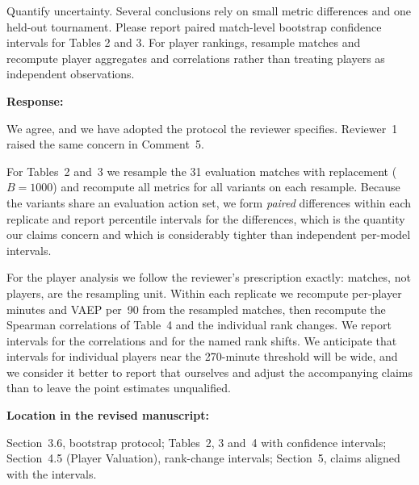 \documentclass[11pt,a4paper]{article}
\newcommand{\pending}[1]{\textcolor{statuspending}{#1}}
\newcommand{\response}[2]{%
  \begin{responsebox}
  \textbf{Response:}

  #1
  \end{responsebox}
  \begin{locationbox}
  \textbf{Location in the revised manuscript:}

  #2
  \end{locationbox}
}
\begin{document}
\begin{reviewbox}[Comment 2]
Quantify uncertainty. Several conclusions rely on small metric differences and one held-out tournament. Please report paired match-level bootstrap confidence intervals for Tables 2 and 3. For player rankings, resample matches and recompute player aggregates and correlations rather than treating players as independent observations.
\end{reviewbox}
\response{We agree, and we have adopted the protocol the reviewer specifies. Reviewer~1 raised the same concern in Comment~5.

\pending{For Tables~2 and~3 we resample the 31 evaluation matches with replacement ($B = 1000$) and recompute all metrics for all variants on each resample. Because the variants share an evaluation action set, we form \emph{paired} differences within each replicate and report percentile intervals for the differences, which is the quantity our claims concern and which is considerably tighter than independent per-model intervals.}

\pending{For the player analysis we follow the reviewer's prescription exactly: matches, not players, are the resampling unit. Within each replicate we recompute per-player minutes and VAEP per~90 from the resampled matches, then recompute the Spearman correlations of Table~4 and the individual rank changes. We report intervals for the correlations and for the named rank shifts. We anticipate that intervals for individual players near the 270-minute threshold will be wide, and we consider it better to report that ourselves and adjust the accompanying claims than to leave the point estimates unqualified.}}{Section~3.6, bootstrap protocol; Tables~2, 3 and~4 with confidence intervals; Section~4.5 (Player Valuation), rank-change intervals; Section~5, claims aligned with the intervals.}
\end{document}
